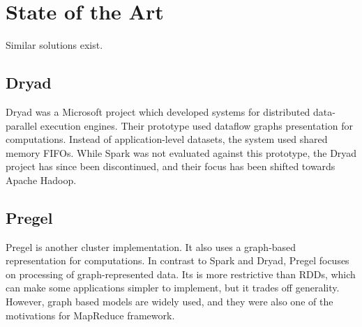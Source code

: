 \chapter{State of the Art\label{stateoftheart}}

Similar solutions exist.

\section{Dryad}
Dryad was a Microsoft project which developed systems for distributed data-parallel execution
engines. Their prototype used dataflow graphs presentation for computations. Instead of application-level datasets, the
system used shared memory FIFOs. While Spark was not evaluated against this prototype, the Dryad project has since been
discontinued, and their focus has been shifted towards Apache Hadoop.

\section{Pregel}
Pregel is another cluster implementation. It also uses a graph-based representation for
computations. In contrast to Spark and Dryad, Pregel focuses on processing of graph-represented data. Its is more
restrictive than RDDs, which can make some applications simpler to implement, but it trades off generality. However,
graph based models are widely used, and they were also one of the motivations for MapReduce framework.

